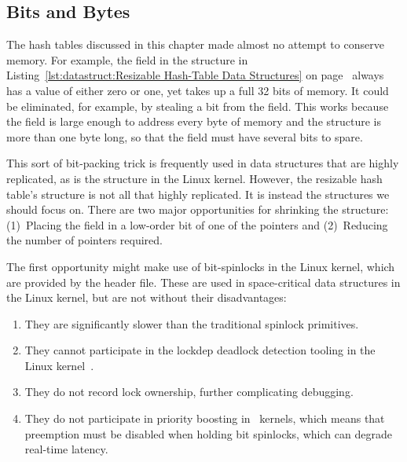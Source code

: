 \subsection{Bits and Bytes}
\label{sec:datastruct:Bits and Bytes}

The hash tables discussed in this chapter made almost no attempt to conserve
memory.
For example, the  field in the  structure in
Listing~\ref{lst:datastruct:Resizable Hash-Table Data Structures} on
page~\pageref{lst:datastruct:Resizable Hash-Table Data Structures}
always has a value of either zero or one, yet takes up a full 32 bits
of memory.
It could be eliminated, for example, by stealing a bit from the
 field.
This works because the  field is large enough to
address every byte of memory and the  structure
is more than one byte long, so that
the  field must have several bits to spare.

This sort of bit-packing trick is frequently used in data structures
that are highly replicated, as is the  structure in the Linux
kernel.
However, the resizable hash table's  structure is not all that
highly replicated.
It is instead the  structures we should focus on.
There are two major opportunities for shrinking the  structure:
(1)~Placing the  field in a low-order bit of one of the
 pointers and (2)~Reducing the number of pointers required.

The first opportunity might make use of bit-spinlocks in the Linux
kernel, which are provided by the 
header file.
These are used in space-critical data structures in the Linux kernel,
but are not without their disadvantages:

\begin{enumerate}
\item	They are significantly slower than the traditional spinlock
	primitives.
\item	They cannot participate in the lockdep deadlock detection
	tooling in the Linux kernel~\cite{JonathanCorbet2006lockdep}.
\item	They do not record lock ownership, further complicating
	debugging.
\item	They do not participate in priority boosting in \rt\ kernels,
	which means that preemption must be disabled when holding
	bit spinlocks, which can degrade real-time latency.
\end{enumerate}

